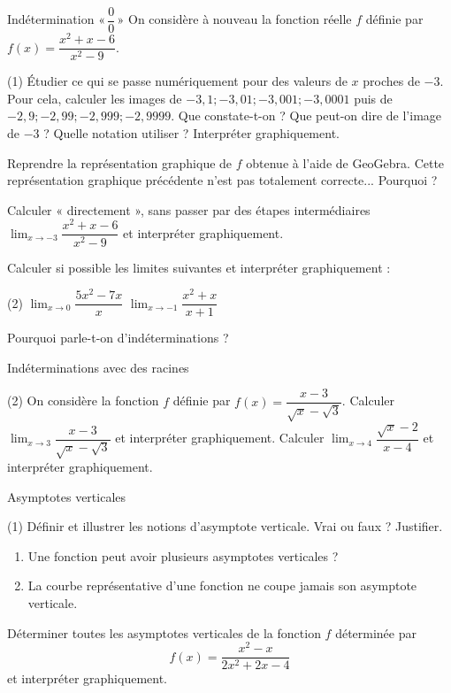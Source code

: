 \documentclass[a4paper,12pt]{article}
\begin{document}
\begin{activite}[label=acti:type00]
	Indétermination $«\,\dfrac{0}{0}\,»$
\tcblower
On considère à nouveau la fonction réelle $f$ définie par $f(x) = \dfrac{x^2 + x - 6}{x^2 - 9}$.

\begin{tasks}(1)
\task Étudier ce qui se passe numériquement pour des valeurs de $x$ proches de $-3$. Pour cela, calculer les images de $-3,1 ; -3,01 ; -3,001 ; -3,0001$ puis de $-2,9 ; -2,99 ; -2,999 ; -2,9999$.
\task Que constate-t-on ?
\task Que peut-on dire de l'image de $-3$ ?
\task Quelle notation utiliser ?
\task Interpréter graphiquement.
\end{tasks}

Reprendre la représentation graphique de $f$ obtenue à l'aide de GeoGebra. Cette représentation graphique précédente n'est pas totalement correcte... Pourquoi ?

Calculer « directement », sans passer par des étapes intermédiaires $\displaystyle\lim_{x \to -3} \dfrac{x^2 + x - 6}{x^2 - 9}$ et interpréter graphiquement.

Calculer si possible les limites suivantes et interpréter graphiquement :
\begin{tasks}(2)
\task $\displaystyle\lim_{x \to 0} \dfrac{5x^2 - 7x}{x}$
\task $\displaystyle\lim_{x \to -1} \dfrac{x^2 + x}{x + 1}$
\end{tasks}

Pourquoi parle-t-on d'indéterminations ?
\end{activite}

\begin{activite}[label=acti:limrac]
Indéterminations avec des racines
\tcblower
\begin{tasks}(2)
\task On considère la fonction $f$ définie par $f(x) = \dfrac{x - 3}{\sqrt{x} - \sqrt{3}}$. Calculer $\displaystyle\lim_{x \to 3} \dfrac{x - 3}{\sqrt{x} - \sqrt{3}}$ et interpréter graphiquement.
\task Calculer $\displaystyle\lim_{x \to 4} \dfrac{\sqrt{x} - 2}{x - 4}$ et interpréter graphiquement.
\end{tasks}
\end{activite}

\begin{activite}[label=acti:asyVert]{Asymptotes verticales}
\tcblower
\begin{tasks}(1)
  \task Définir et illustrer les notions d’asymptote verticale. 
  \task Vrai ou faux ? Justifier.
    \begin{enumerate}
      \item Une fonction peut avoir plusieurs asymptotes verticales ?
      \item La courbe représentative d’une fonction ne coupe jamais son asymptote verticale.
    \end{enumerate}
  \task Déterminer toutes les asymptotes verticales de la fonction \(f\) déterminée par
  \[
    f(x)=\dfrac{x^2 - x}{2x^2 + 2x - 4}
  \]
  et interpréter graphiquement.
\end{tasks}
\end{activite}
\end{document}
